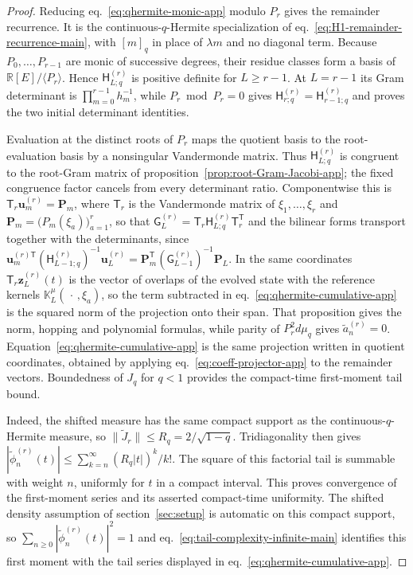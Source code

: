 \documentclass[a4paper,11pt]{article}
\def\dd{d}%
\def\Jac{J}%
\theoremstyle{definition}
\theoremstyle{remark}
\newcommand{\dd}{\mathrm d}
\newcommand{\RR}{\mathbb R}
\newcommand{\Jac}{\mathsf J}
\newcommand{\tphi}{\widetilde\phi}
\begin{document}
\begin{proof}
Reducing eq.~\eqref{eq:qhermite-monic-app} modulo $P_r$ gives the
remainder recurrence.  It is the continuous-$q$-Hermite specialization of
eq.~\eqref{eq:H1-remainder-recurrence-main}, with $[m]_q$ in place of $\lambda m$ and no
diagonal term.  Because $P_0,\ldots,P_{r-1}$ are monic of successive degrees, their residue classes
form a basis of $\RR[E]/\langle P_r\rangle$.  Hence $\mathsf H_{L;q}^{(r)}$ is positive definite
for $L\ge r-1$.  At $L=r-1$ its Gram determinant is
$\prod_{m=0}^{r-1}h_m^{-1}$, while $P_r\bmod P_r=0$ gives
$\mathsf H_{r;q}^{(r)}=\mathsf H_{r-1;q}^{(r)}$ and proves the two initial determinant identities.

Evaluation at the distinct roots of $P_r$
maps the quotient basis to the root-evaluation basis by a nonsingular
Vandermonde matrix.  Thus $\mathsf H_{L;q}^{(r)}$ is congruent to the
root-Gram matrix of proposition~\ref{prop:root-Gram-Jacobi-app};
the fixed congruence factor cancels from every determinant ratio. Componentwise this is $\mathsf T_r\boldsymbol u_m^{(r)}=\boldsymbol P_m$, where $\mathsf T_r$ is
the Vandermonde matrix of $\xi_1,\ldots,\xi_r$ and
$\boldsymbol P_m=\bigl(P_m(\xi_a)\bigr)_{a=1}^{r}$, so that
$\mathsf G_L^{(r)}=\mathsf T_r\mathsf H_{L;q}^{(r)}\mathsf T_r^{\mathsf T}$ and the bilinear forms
transport together with the determinants, since
$\boldsymbol u_m^{(r)\mathsf T}(\mathsf H_{L-1;q}^{(r)})^{-1}\boldsymbol u_L^{(r)}
=\boldsymbol P_m^{\mathsf T}(\mathsf G_{L-1}^{(r)})^{-1}\boldsymbol P_L$.
In the same coordinates $\mathsf T_r\boldsymbol z_L^{(r)}(t)$ is the vector of overlaps of the
evolved state with the reference kernels $\mathbb K_L^\mu(\,\cdot\,,\xi_a)$, so the term subtracted
in eq.~\eqref{eq:qhermite-cumulative-app} is the squared norm of the projection onto their span.
That proposition gives the norm, hopping and polynomial formulas,
while parity of $P_r^2\dd\mu_q$ gives
$\widetilde a_n^{(r)}=0$.  Equation~\eqref{eq:qhermite-cumulative-app}
is the same projection written in quotient coordinates, obtained by applying
eq.~\eqref{eq:coeff-projector-app} to the remainder vectors.  Boundedness
of $\Jac_q$ for $q<1$ provides the compact-time first-moment tail bound.

Indeed, the shifted measure has the same compact support as the continuous-$q$-Hermite
measure, so $\|\widetilde\Jac_r\|\le R_q=2/\sqrt{1-q}$.  Tridiagonality then gives
$|\tphi_n^{(r)}(t)|\le
\sum_{k=n}^{\infty}(R_q|t|)^k/k!$.  The square of this factorial tail is summable with weight $n$,
uniformly for $t$ in a compact interval.  This proves convergence of the first-moment series and its
asserted compact-time uniformity. The shifted density assumption of section~\ref{sec:setup} is automatic on this compact support, so
$\sum_{n\ge0}|\tphi_n^{(r)}(t)|^2=1$ and eq.~\eqref{eq:tail-complexity-infinite-main} identifies
this first moment with the tail series displayed in
eq.~\eqref{eq:qhermite-cumulative-app}.
\end{proof}
\end{document}
